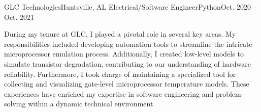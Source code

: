 \Experience
{GLC Technologies}{Huntsville, AL}
{Electrical/Software Engineer}{Python}{Oct. 2020 – Oct. 2021}

During my tenure at GLC, I played a pivotal role in several key areas. My responsibilities included developing automation tools to streamline the intricate microprocessor emulation process. Additionally, I created low-level models to simulate transistor degradation, contributing to our understanding of hardware reliability. Furthermore, I took charge of maintaining a specialized tool for collecting and visualizing gate-level microprocessor temperature models. These experiences have enriched my expertise in software engineering and problem-solving within a dynamic technical environment
